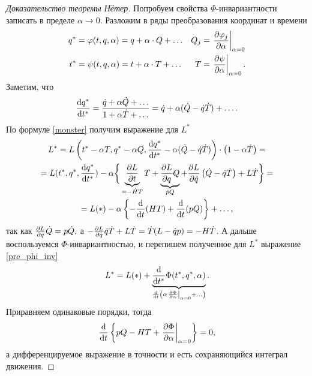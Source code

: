 \begin{proof}[Доказательство теоремы Нётер]
Попробуем свойства $\Phi$-инвариантности записать в пределе $\alpha \to 0$. Разложим в ряды преобразования координат  и времени
\begin{align}
q^* &= \varphi(t, q, \alpha) = q + \alpha \cdot Q + \ldots & Q_j &= \left. \pdv{\varphi_j}{\alpha} \right|_{\alpha = 0}\\
t^* &= \psi (t, q, \alpha) =  t + \alpha \cdot T + \ldots & T &= \left. \pdv{\psi}{\alpha} \right|_{\alpha = 0}.
\end{align}
Заметим, что 
\begin{equation}
\dv{q^*}{t^*} = \frac{\dot{q} + \alpha \dot{Q} + \ldots}{1 + \alpha \dot{T} + \ldots} = \dot{q} + \alpha (\dot{Q} - \dot{q} \dot{T}) + \ldots.
\end{equation}
По формуле \eqref{monster} получим выражение для $L^*$
\begin{gather}
L^* = L\left(t^* - \alpha T, q^* - \alpha Q, \dv{q^*}{t^*} - \alpha(\dot{Q} - \dot{q} \dot{T}) \right) \cdot \left(1 - \alpha \dot{T} \right) =\\
= L(t^*, q^*, \dv{q^*}{t^*}) - \alpha \bigg\{ \underbrace{\pdv{L}{t}}_{= - \dot{H} T} T + \underbrace{\pdv{L}{q} Q}_{\dot{p} Q} + \pdv{L}{\dot{q}} \left(\dot{Q} - \dot{q} \dot{T}\right) + L\dot{T}  \bigg\} =\\
= L(*)  - \alpha \left\{-\dv{t} (HT) + \dv{t}(pQ)\right\} + \ldots, \label{pre_phi_inv}
\end{gather}
так как $\pdv{L}{\dot{q}} \dot{Q} = p \dot{Q},$ а $-\pdv{L}{\dot{q}} \dot{q} \dot{T} + L\dot{T} = \dot{T} (L - \dot{q} p) = - H\dot{T}$. А дальше воспользуемся $\Phi$-инвариантностью, и перепишем полученное для $L^*$ выражение \eqref{pre_phi_inv}
\begin{equation}
 L^* = L(*) + \underbrace{\dv{t^*} \Phi(t^*, q^*, \alpha)}_{\dv{t}\left(\alpha \left. \pdv{\Phi}{\alpha}\right|_{\alpha = 0} + \ldots\right)}.
 \end{equation} 
 Приравняем одинаковые порядки, тогда
 \begin{equation}
 \dv{t} \left\{ pQ - HT + \left. \pdv{\Phi}{\alpha} \right|_{\alpha = 0} \right\} = 0,
 \end{equation}
а дифференцируемое выражение в точности и есть сохраняющийся интеграл движения.
\end{proof}

